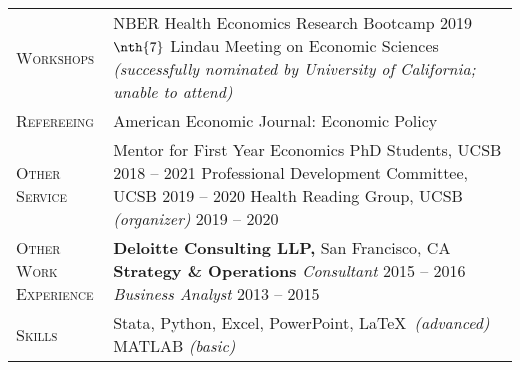 \documentclass[11pt]{article}
\begin{document}
\begin{tabularx}{\textwidth}{@{}Y Z@{}}
	\textsc{Workshops} & 
	NBER Health Economics Research Bootcamp \hfill 2019
	\vspace{6pt} \newline
	$\nth{7}$ Lindau Meeting on Economic Sciences \newline \textit{(successfully nominated by University of California; unable to attend)} 
	\\ \addlinespace[20pt] 
	
	\textsc{Refereeing}  & 
	American Economic Journal: Economic Policy
	 \\ \addlinespace[20pt] 
	
	\textsc{Other \newline Service} & 
	Mentor for First Year Economics PhD Students, UCSB \hfill 2018 -- 2021
	\vspace{3pt} \newline
	Professional Development Committee, UCSB \hfill 2019 -- 2020
	\vspace{3pt} \newline
	Health Reading Group, UCSB \textit{(organizer)} \hfill 2019 -- 2020 
	\vspace{0pt}
	\\ \addlinespace[20pt] 
	
	
	\textsc{Other Work \newline Experience}  & 
	\textbf{Deloitte Consulting LLP,} San Francisco, CA
	\vspace{0pt} \newline
	\textbf{Strategy \& Operations} 
	\vspace{3pt} \newline
	\textit{Consultant} \hfill 2015 -- 2016
	\vspace{0pt} \newline
	\textit{Business Analyst} \hfill 2013 -- 2015
	\vspace{0pt}
	\\ \addlinespace[20pt] 
	
	\textsc{Skills}  & 
	Stata, Python, Excel, PowerPoint, \LaTeX \ \textit{(advanced)}
	\vspace{3pt} \newline
	MATLAB \textit{(basic)}
	\\ 
	

\end{tabularx}
\end{document}
